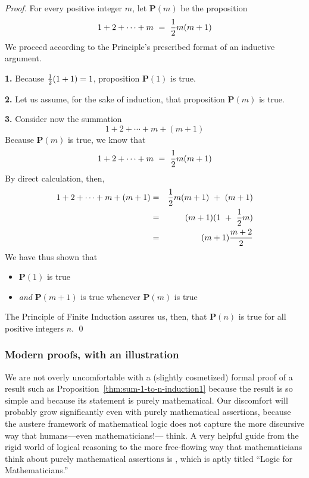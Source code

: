 \begin{proof}
For every positive integer $m$, let {\bf P}$(m)$ be the proposition
\[  1 + 2 + \cdots + m \ = \ {1 \over 2} m(m+1) \]
We proceed according to the Principle's prescribed format of an
inductive argument.

{\bf 1.} Because ${1 \over 2}(1+1) = 1$, proposition {\bf P}$(1)$ is true.

{\bf 2.} Let us assume, for the sake of induction, that proposition
{\bf P}$(m)$ is true.

{\bf 3.} Consider now the summation
\[ 1 + 2 + \cdots + m + (m+1) \]
Because {\bf P}$(m)$ is true, we know that
\[ 1 + 2 + \cdots + m \ = \ {1 \over 2} m(m+1) \]
By direct calculation, then,
\begin{eqnarray*}
1 + 2 + \cdots + m + (m+1)
  & = & {1 \over 2} m(m+1) \ + \ (m+1) \\
  & = & (m+1) ( 1 \ + \ {1 \over 2} m ) \\
  & = & (m+1)\frac{m+2}{2} 
\end{eqnarray*}
We have thus shown that
\begin{itemize}
\item
{\bf P}$(1)$ is true
\item
{\em and}
{\bf P}$(m+1)$ is true whenever {\bf P}$(m)$ is true
\end{itemize}
The Principle of Finite Induction assures us, then, that {\bf P}$(n)$
is true for all positive integers $n$.  \qed
\end{proof}


\subsubsection{Modern proofs, with an illustration}
\label{sec:modern-proof}

We are not overly uncomfortable with a (slightly cosmetized) formal
proof of a result such as Proposition~\ref{thm:sum-1-to-n-induction1}
because the result is so simple and because its statement is purely
mathematical.  Our discomfort will probably grow significantly even
with purely mathematical assertions, because the austere framework of
mathematical logic does not capture the more discursive way that
humans---even mathematicians!--- think.  A very helpful guide from the
rigid world of logical reasoning to the more free-flowing way that
mathematicians think about purely mathematical assertions is
\cite{Rosser53}, which is aptly titled ``Logic for Mathematicians.''

